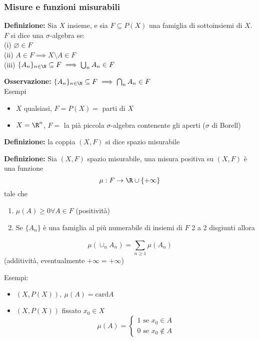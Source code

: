 \subsubsection{Misure e funzioni misurabili}
\begin{tcolorbox}
	\textbf{Definizione:} Sia $X$ insieme, e sia $F\subseteq P(X)$ una famiglia di sottoinsiemi di $X$.
	\\$F$ si dice una $\sigma$-algebra se:
	\\(i) $\varnothing\in F$
	\\(ii) $A\in F\implies X\setminus A\in F$
	\\(iii) $\{A_n\} _{n \in \N}\subseteq F\implies \bigcup_{n}A_n\in F$
\end{tcolorbox}
\textbf{Osservazione:} $\{A_n\} _{n\in\N}\subseteq F\implies \bigcap_n A_n \in F$
\\Esempi
\begin{itemize}
	\item $X$ qualsiasi, $F=P(X)=$ parti di $X$
	\item $X=\R^n$, $F=$ la pià piccola $\sigma$-algebra contenente gli aperti ($\sigma$ di Borell) 
\end{itemize}
\begin{tcolorbox}
	\textbf{Definizione: } la coppia $(X,F)$ si dice spazio misurabile

\end{tcolorbox}
\begin{tcolorbox}
	\textbf{Definizione:} Sia $(X,F)$ spazio misurabile, una misura positiva su $(X,F) $ è una funzione
\[\mu:F\to \R\cup \{+\infty\} \] 
tale che
\begin{enumerate}
	\item $\mu(A)\ge 0\forall A\in F$ (positività)
	\item Se $\{A_n\} $ è una famiglia al più numerabile di insiemi di $F$ 2 a 2 disgiunti allora 
\end{enumerate}
\[\mu(\cup _n A_n)=\sum_{n\ge 1}^{} \mu(A_n)\]
(additività, eventualmente $+\infty=+\infty$)
\end{tcolorbox}
Esempi:
\begin{itemize}
\item $(X,P(X)),\ \mu(A)=\text{card}A$
\item $(X,P(X))$ fissato $x_0\in X$
	\[\mu(A)=\begin{cases}
		1\text{  se }x_0\in A\\
		0\text{  se }x_0\not\in A
	\end{cases}\]
\end{itemize}
